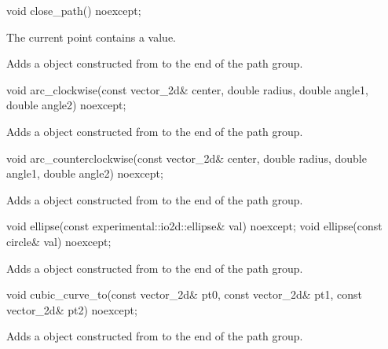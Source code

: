 \begin{itemdecl}
void close_path() noexcept;
\end{itemdecl}
\begin{itemdescr}
\pnum
\requires
The current point contains a value.

\pnum
\effects
Adds a  object constructed from  to the end of the path group.
\end{itemdescr}

\begin{itemdecl}
void arc_clockwise(const vector_2d& center, double radius, double angle1,
  double angle2) noexcept;
\end{itemdecl}
\begin{itemdescr}
\pnum
\effects
Adds a  object constructed from  to the end of the path group.
\end{itemdescr}

\begin{itemdecl}
void arc_counterclockwise(const vector_2d& center, double radius,
  double angle1, double angle2) noexcept;
\end{itemdecl}
\begin{itemdescr}
\pnum
\effects
Adds a  object constructed from  to the end of the path group.
\end{itemdescr}

\begin{itemdecl}
void ellipse(const experimental::io2d::ellipse& val) noexcept;
void ellipse(const circle& val) noexcept;
\end{itemdecl}
\begin{itemdescr}
\pnum
\effects
Adds a  object constructed from  to the end of the path group.
\end{itemdescr}

\begin{itemdecl}
void cubic_curve_to(const vector_2d& pt0, const vector_2d& pt1,
  const vector_2d& pt2) noexcept;
\end{itemdecl}
\begin{itemdescr}
\pnum
\effects
\pnum
Adds a  object constructed from  to the end of the path group.
\end{itemdescr}


